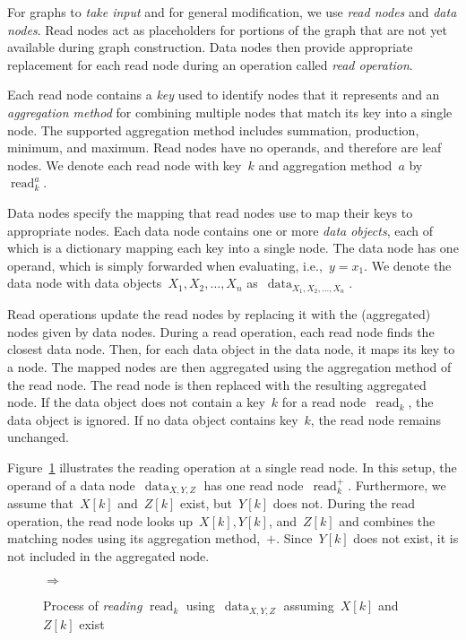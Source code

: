 \documentclass{article}
\DeclareMathOperator{\readNode}{read}
\DeclareMathOperator{\dataNode}{data}
\begin{document}
For graphs to \emph{take input} and for general modification, we use \emph{read nodes} and \emph{data nodes}.
Read nodes act as placeholders for portions of the graph that are not yet available during graph construction.
Data nodes then provide appropriate replacement for each read node during an operation called \emph{read operation}.

Each read node contains a \emph{key} used to identify nodes that it represents and an \emph{aggregation method} for combining multiple nodes that match its key into a single node.
The supported aggregation method includes summation, production, minimum, and maximum.
Read nodes have no operands, and therefore are leaf nodes.
We denote each read node with key~$k$ and aggregation method~$a$ by~$\readNode_k^a$.

Data nodes specify the mapping that read nodes use to map their keys to appropriate nodes.
Each data node contains one or more \emph{data objects}, each of which is a dictionary mapping each key into a single node.
The data node has one operand, which is simply forwarded when evaluating, i.e.,~$y = x_1$.
We denote the data node with data objects~$X_1, X_2, \dots, X_n$ as~$\dataNode_{X_1, X_2,\dots, X_n}$.

Read operations update the read nodes by replacing it with the (aggregated) nodes given by data nodes.
During a read operation, each read node finds the closest data node.
Then, for each data object in the data node, it maps its key to a node.
The mapped nodes are then aggregated using the aggregation method of the read node.
The read node is then replaced with the resulting aggregated node.
If the data object does not contain a key~$k$ for a read node~$\readNode_k$, the data object is ignored.
If no data object contains key~$k$, the read node remains unchanged.

Figure~\ref{fig:modification:reading} illustrates the reading operation at a single read node.
In this setup, the operand of a data node~$\dataNode_{X,Y,Z}$ has one read node~$\readNode_k^+$.
Furthermore, we assume that~$X[k]$ and~$Z[k]$ exist, but~$Y[k]$ does not.
During the read operation, the read node looks up~$X[k], Y[k]$, and~$Z[k]$ and combines the matching nodes using its aggregation method,~$+$.
Since~$Y[k]$ does not exist, it is not included in the aggregated node.
%
\begin{figure}
	\centering
	\quad$\Rightarrow$\quad
	\caption{Process of \emph{reading} $\readNode_k$ using~$\dataNode_{X, Y, Z}$ assuming~$X[k]$ and~$Z[k]$ exist}
	\label{fig:modification:reading}
\end{figure}
\end{document}
